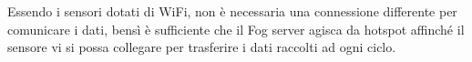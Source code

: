 Essendo i sensori dotati di WiFi, non è necessaria una connessione differente per comunicare i dati,
bensì è sufficiente che il Fog server agisca da hotspot affinché il sensore vi si possa collegare per trasferire i dati raccolti ad ogni ciclo.

